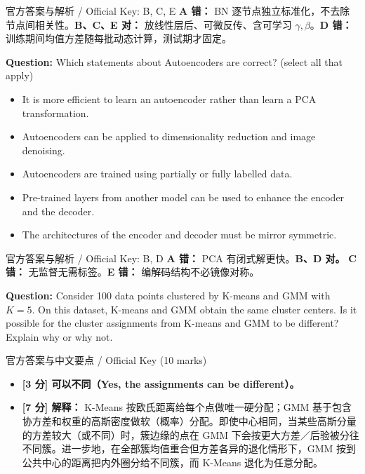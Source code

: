 \begin{StudySolution}{官方答案与解析 / Official Key: B, C, E}
\textbf{A 错：} BN 逐节点独立标准化，不去除节点间相关性。\textbf{B、C、E 对：} 放线性层后、可微反传、含可学习 $\gamma,\beta$。\textbf{D 错：} 训练期间均值方差随每批动态计算，测试期才固定。
\end{StudySolution}

\textbf{Question:} Which statements about Autoencoders are correct? (select all that apply)
\begin{itemize}
\item[A)] It is more efficient to learn an autoencoder rather than learn a PCA transformation.
\item[B)] Autoencoders can be applied to dimensionality reduction and image denoising.
\item[C)] Autoencoders are trained using partially or fully labelled data.
\item[D)] Pre-trained layers from another model can be used to enhance the encoder and the decoder.
\item[E)] The architectures of the encoder and decoder must be mirror symmetric.
\end{itemize}

\begin{StudySolution}{官方答案与解析 / Official Key: B, D}
\textbf{A 错：} PCA 有闭式解更快。\textbf{B、D 对。} \textbf{C 错：} 无监督无需标签。\textbf{E 错：} 编解码结构不必镜像对称。
\end{StudySolution}


\textbf{Question:} Consider 100 data points clustered by K-means and GMM with $K=5$. On this dataset, K-means and GMM obtain the same cluster centers. Is it possible for the cluster assignments from K-means and GMM to be different? Explain why or why not.

\begin{StudySolution}{官方答案与中文要点 / Official Key (10 marks)}
\begin{itemize}
\item \textbf{[3 分] 可以不同（Yes, the assignments can be different）。}
\item \textbf{[7 分] 解释：} K-Means 按欧氏距离给每个点做唯一硬分配；GMM 基于包含协方差和权重的高斯密度做软（概率）分配。即使中心相同，当某些高斯分量的方差较大（或不同）时，簇边缘的点在 GMM 下会按更大方差／后验被分往不同簇。进一步地，在全部簇均值重合但方差各异的退化情形下，GMM 按到公共中心的距离把内外圈分给不同簇，而 K-Means 退化为任意分配。
\end{itemize}
\end{StudySolution}

